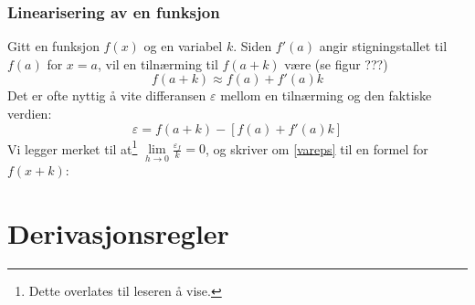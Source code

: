 \subsubsection{Linearisering av en funksjon}
Gitt en funksjon $ f(x) $ og en variabel $ k $. Siden $ f'(a) $ angir stigningstallet til $ f(a) $ for $ x=a $, vil en tilnærming til $ f(a+k) $ være (se figur ???)
\[ f(a+k)\approx f(a)+f'(a)k \]
Det er ofte nyttig å vite differansen $ \varepsilon $ mellom en tilnærming og den faktiske verdien:
\begin{equation}\label{vareps}
	\varepsilon = f(a+k)-\left[f(a)+f'(a)k\right]
\end{equation}
Vi legger merket til at\footnote{Dette overlates til leseren å vise.} $ \lim\limits_{h\to0}\frac{\varepsilon_f}{k} =0 $, og skriver om \eqref{vareps} til en formel for $ f(x+k) $: \regv
{}

\section{Derivasjonsregler}
